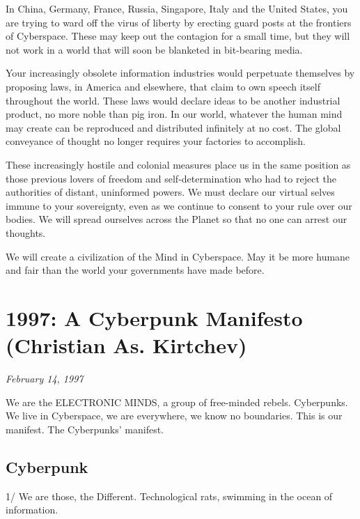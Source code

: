 \documentclass[letterpaper,12pt,english]{sphinxmanual}
\begin{document}
In China, Germany, France, Russia, Singapore, Italy and the United States, you are trying to ward off the virus of liberty by erecting guard posts at the frontiers of Cyberspace. These may keep out the contagion for a small time, but they will not work in a world that will soon be blanketed in bit-bearing media.

Your increasingly obsolete information industries would perpetuate themselves by proposing laws, in America and elsewhere, that claim to own speech itself throughout the world. These laws would declare ideas to be another industrial product, no more noble than pig iron. In our world, whatever the human mind may create can be reproduced and distributed infinitely at no cost. The global conveyance of thought no longer requires your factories to accomplish.

These increasingly hostile and colonial measures place us in the same position as those previous lovers of freedom and self-determination who had to reject the authorities of distant, uninformed powers. We must declare our virtual selves immune to your sovereignty, even as we continue to consent to your rule over our bodies. We will spread ourselves across the Planet so that no one can arrest our thoughts.

We will create a civilization of the Mind in Cyberspace. May it be more humane and fair than the world your governments have made before.


\chapter{1997: A Cyberpunk Manifesto (Christian As. Kirtchev)}
\label{1997::doc}\label{1997:index-0}\label{1997:a-cyberpunk-manifesto-christian-as-kirtchev}
\emph{February 14, 1997}

We are the ELECTRONIC MINDS, a group of free-minded rebels. Cyberpunks. We live in Cyberspace, we are everywhere, we know no boundaries. This is our manifest. The Cyberpunks' manifest.


\section{Cyberpunk}
\label{1997:cyberpunk}
1/ We are those, the Different. Technological rats, swimming in the ocean of information.
\end{document}
